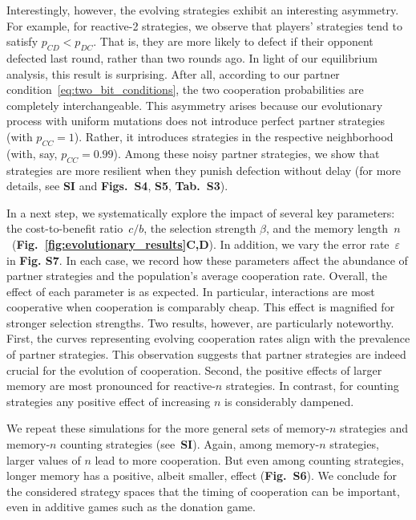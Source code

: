 \documentclass[9pt,twocolumn,twoside]{pnas-new}
\newcommand{\figref}[1]{{\textbf{Fig.~\ref{#1}}}}
\def\SI{\textbf{SI}}
\begin{document}
Interestingly, however, the evolving strategies exhibit an interesting asymmetry. 
For example, for reactive-2 strategies, we observe that players' strategies tend to satisfy $p_{CD}\!<\!p_{DC}$. 
That is, they are more likely to defect if their opponent defected last round, rather than two rounds ago. 
In light of our equilibrium analysis, this result is surprising. 
After all, according to our partner condition~\eqref{eq:two_bit_conditions}, the two cooperation probabilities are completely interchangeable. 
This asymmetry arises because our evolutionary process with uniform mutations does not introduce perfect partner strategies (with $p_{CC}\!=\!1$). 
Rather, it introduces strategies in the respective neighborhood (with, say, $p_{CC}\!=\!0.99$).
Among these noisy partner strategies, we show that strategies are more resilient when they punish defection without delay (for more details, see \SI{} and \textbf{Figs.~S4}, \textbf{S5}, \textbf{Tab.~S3}). 
 

In a next step, we systematically explore the impact of several key parameters: the cost-to-benefit ratio~$c/b$, the selection strength $\beta$, and the memory length~$n$~(\figref{fig:evolutionary_results}\textbf{C,D}). 
In addition, we vary the error rate~$\varepsilon$ in \textbf{Fig. S7}. 
In each case, we record how these parameters affect the abundance of partner strategies and the population's average cooperation rate. 
Overall, the effect of each parameter is as expected.  
In particular, interactions are most cooperative when cooperation is comparably cheap. 
This effect is magnified for stronger selection strengths. 
Two results, however, are particularly noteworthy. 
First, the curves representing evolving cooperation rates align with the prevalence of partner strategies. 
This observation suggests that partner strategies are indeed crucial for the evolution of cooperation. 
Second, the positive effects of larger memory are most pronounced for reactive-$n$ strategies. 
In contrast, for counting strategies any positive effect of increasing $n$ is considerably dampened. 

We repeat these simulations for the more general sets of memory-$n$ strategies and memory-$n$ counting strategies (see~\SI). 
Again, among memory-$n$ strategies, larger values of $n$ lead to more cooperation. 
But even among counting strategies, longer memory has a positive, albeit smaller, effect (\textbf{Fig.~S6}). 
We conclude for the considered strategy spaces that the timing of cooperation can be important, even in additive games such as the donation game. 
\end{document}
